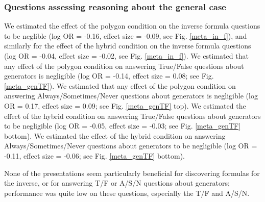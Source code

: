 \documentclass[man,10pt]{apa6}
\begin{document}
\subsubsection{Questions assessing reasoning about the general case} We estimated the effect of the polygon condition on the inverse formula questions to be neglible (log OR = -0.16, effect size = -0.09, see Fig. \ref{meta_in_f}), and similarly for the effect of the hybrid condition on the inverse formula questions (log OR = -0.04, effect size = -0.02, see Fig. \ref{meta_in_f}). We estimated that any effect of the polygon condition on answering True/False questions about generators is negligible (log OR = -0.14, effect size = 0.08; see Fig. \ref{meta_genTF}). We estimated that any effect of the polygon condition on answering Always/Sometimes/Never questions about generators is negligible (log OR = 0.17, effect size = 0.09; see Fig. \ref{meta_genTF} top). We estimated the effect of the hybrid condition on answering True/False questions about generators to be negligible (log OR = -0.05, effect size = -0.03; see Fig. \ref{meta_genTF} bottom). We estimated the effect of the hybrid condition on answering Always/Sometimes/Never questions about generators to be negligible (log OR = -0.11, effect size = -0.06; see Fig. \ref{meta_genTF} bottom). \par
None of the presentations seem particularly beneficial for discovering formulas for the inverse, or for answering T/F or A/S/N questions about generators; performance was quite low on these questions, especially the T/F and A/S/N.
\end{document}
